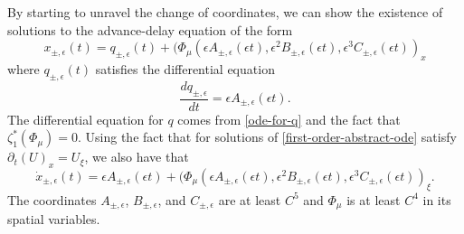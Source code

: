 By starting to unravel the change of coordinates, we can show the existence of solutions to the advance-delay equation of the form
\begin{equation}
	x_{\pm,\epsilon}(t) = q_{\pm, \epsilon}(t) + (\Phi_\mu(\epsilon A_{\pm, \epsilon}(\epsilon t),\epsilon^2 B_{\pm, \epsilon}(\epsilon t) ,\epsilon^3 C_{\pm, \epsilon}(\epsilon t))_x
\end{equation}
where \(q_{\pm, \epsilon}(t)\) satisfies the differential equation
\begin{equation}
	\frac{dq_{\pm, \epsilon}}{dt} =  \epsilon A_{\pm, \epsilon}(\epsilon t).
\end{equation}
The differential equation for \(q\) comes from \cref{ode-for-q} and the fact that \(\zeta_1^*(\Phi_\mu) = 0\). Using the fact that for solutions of \cref{first-order-abstract-ode} satisfy \(\partial_t (U)_x = U_\xi\), we also have that
\begin{equation}
	\dot x_{\pm, \epsilon}(t) =  \epsilon A_{\pm, \epsilon}(\epsilon t) + (\Phi_\mu(\epsilon A_{\pm, \epsilon}(\epsilon t),\epsilon^2 B_{\pm, \epsilon}(\epsilon t) ,\epsilon^3 C_{\pm, \epsilon}(\epsilon t))_\xi.
\end{equation}
The coordinates \(A_{\pm, \epsilon}\), \(B_{\pm, \epsilon}\), and  \(C_{\pm, \epsilon}\) are at least \(C^5\) and \(\Phi_\mu\) is at least \(C^4\) in its spatial variables.

